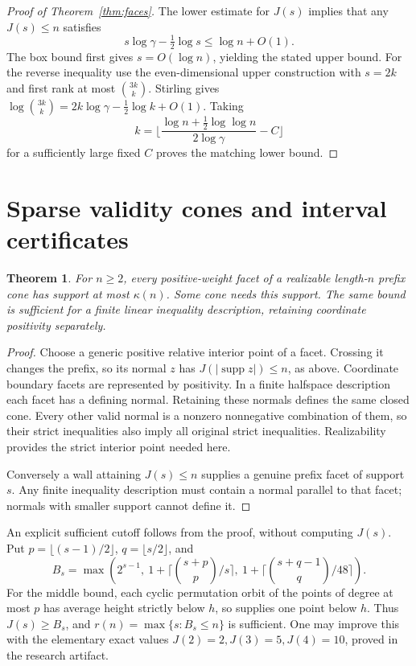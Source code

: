 \documentclass[11pt,a4paper]{article}
\newtheorem{theorem}{Theorem}
\theoremstyle{remark}\newtheorem{remark}[theorem]{Remark}
\newcommand{\supp}{\operatorname{supp}}
\newcommand{\fl}[1]{\lfloor#1\rfloor}
\newcommand{\ce}[1]{\lceil#1\rceil}
\newcommand{\ga}{\gamma}
\begin{document}
\begin{proof}[Proof of Theorem~\ref{thm:faces}]
The lower estimate for \(J(s)\) implies that any \(J(s)\leq n\)
satisfies
\[
 s\log\ga-\tfrac12\log s\leq\log n+O(1).
\]
The box bound first gives \(s=O(\log n)\), yielding the stated
upper bound. For the reverse inequality use the even-dimensional
upper construction with \(s=2k\) and first rank at most
\(\binom{3k}{k}\). Stirling gives
\(\log\binom{3k}{k}=2k\log\ga-\tfrac12\log k+O(1)\).
Taking
\[
 k=\fl{\frac{\log n+\tfrac12\log\log n}{2\log\ga}-C}
\]
for a sufficiently large fixed \(C\) proves the matching lower bound.
\end{proof}

\section{Sparse validity cones and interval certificates}
\begin{theorem}\label{thm:cone}
For \(n\geq2\), every positive-weight facet of a realizable length-\(n\) prefix
cone has support at most \(\kappa(n)\). Some cone needs this support.
The same bound is sufficient for a finite linear inequality
description, retaining coordinate positivity separately.
\end{theorem}
\begin{proof}
Choose a generic positive relative interior point of a facet.
Crossing it changes the prefix, so its normal \(z\) has
\(J(|\supp z|)\leq n\), as above. Coordinate boundary facets
are represented by positivity. In a finite halfspace description
each facet has a defining normal. Retaining these normals defines
the same closed cone. Every other valid normal is a nonzero
nonnegative combination of them, so their strict inequalities
also imply all original strict inequalities. Realizability
provides the strict interior point needed here.

Conversely a wall attaining \(J(s)\leq n\) supplies a genuine
prefix facet of support \(s\). Any finite inequality description
must contain a normal parallel to that facet; normals with
smaller support cannot define it.
\end{proof}

An explicit sufficient cutoff follows from the proof, without
computing \(J(s)\). Put \(p=\fl{(s-1)/2}\), \(q=\fl{s/2}\), and
\[
 B_s=\max\left(2^{s-1},\
  1+\ce{\binom{s+p}{p}/s},\
  1+\ce{\binom{s+q-1}{q}/48}\right).
\]
For the middle bound, each cyclic permutation orbit of the
points of degree at most \(p\) has average height strictly
below \(h\), so supplies one point below \(h\).
Thus \(J(s)\geq B_s\), and
\(r(n)=\max\{s:B_s\leq n\}\) is sufficient.
One may improve this with the elementary exact values
\(J(2)=2,J(3)=5,J(4)=10\), proved in the research artifact.
\end{document}
